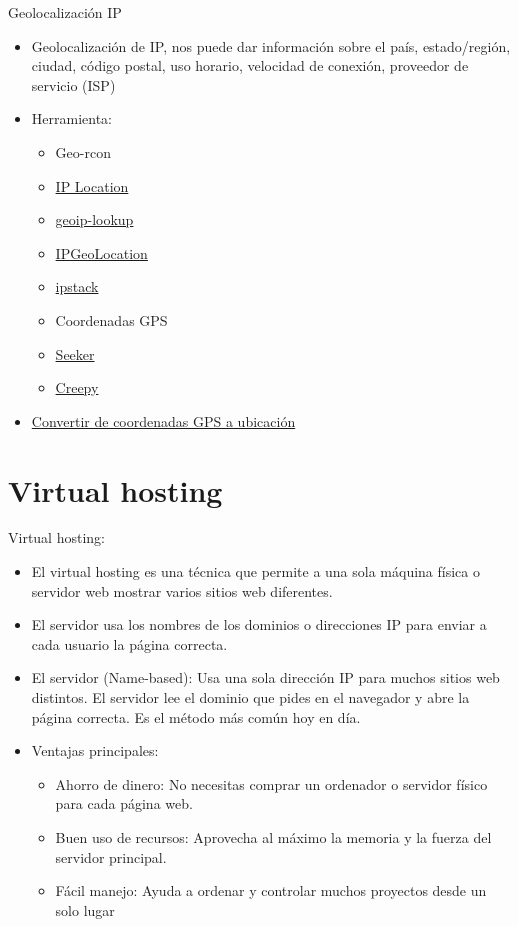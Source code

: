 \documentclass[aspectratio=169,11pt]{beamer}
\begin{document}
\begin{frame}[allowframebreaks]{Geolocalización IP}
\small
  \begin{itemize}
  \item Geolocalización de IP, nos puede dar información sobre el país, estado/región, ciudad, código postal, uso horario, velocidad de conexión, proveedor de servicio (ISP)
  \item Herramienta:
    \begin{itemize}

  \item Geo-rcon
  \item \href{https://www.iplocation.net/}{IP Location}
  \item \href{https://github.com/lksnyder0/geoip-lookup}{geoip-lookup}
  \item \href{https://github.com/maldevel/IPGeoLocation}{IPGeoLocation}
  \item \href{https://ipstack.com/}{ipstack}
  \item Coordenadas GPS
  \item \href{https://github.com/thewhiteh4t/seeker}{Seeker}
  \item \href{https://github.com/ilektrojohn/creepy}{Creepy}
    \end{itemize}
  \item \href{https://www.coordenadas-gps.com/}{Convertir de coordenadas GPS a ubicación}
  \end{itemize}
\end{frame}

\section{Virtual hosting}

\begin{frame}[allowframebreaks]{Virtual hosting:}
\small
  \begin{itemize}
    \item El virtual hosting es una técnica que permite a una sola máquina física o servidor web mostrar varios sitios web diferentes. 
    \item El servidor usa los nombres de los dominios o direcciones IP para enviar a cada usuario la página correcta.
    \item El servidor (Name-based): Usa una sola dirección IP para muchos sitios web distintos. El servidor lee el dominio que pides en el navegador y abre la página correcta. Es el método más común hoy en día.
    \item Ventajas principales:
      \begin{itemize}

    \item Ahorro de dinero: No necesitas comprar un ordenador o servidor físico para cada página web.
    \item Buen uso de recursos: Aprovecha al máximo la memoria y la fuerza del servidor principal.
    \item Fácil manejo: Ayuda a ordenar y controlar muchos proyectos desde un solo lugar       \end{itemize}

  \end{itemize}
\end{frame}
\end{document}
